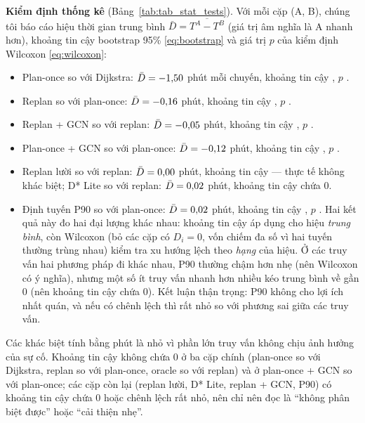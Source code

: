 \textbf{Kiểm định thống kê} (Bảng~\ref{tab:tab_stat_tests}). Với mỗi cặp (A, B), chúng tôi báo cáo hiệu thời gian trung
bình $\bar{D}=\overline{T^A-T^B}$ (giá trị âm nghĩa là A nhanh hơn), khoảng tin cậy bootstrap 95\% \eqref{eq:bootstrap} và
giá trị $p$ của kiểm định Wilcoxon \eqref{eq:wilcoxon}:
\begin{itemize}
    \item Plan-once so với Dijkstra: $\bar{D}=-1{,}50$ phút mỗi chuyến, khoảng tin cậy
    \CiPlanOnceDijkstraLength, $p$ \PPlanOnceDijkstraLength.
    \item Replan so với plan-once: $\bar{D}=-0{,}16$ phút, khoảng tin cậy \CiReplanPlanOnce, $p$ \PReplanPlanOnce.
    \item Replan + GCN so với replan: $\bar{D}=-0{,}05$ phút, khoảng tin cậy \CiReplanGnnReplan, $p$ \PReplanGnnReplan.
    \item Plan-once + GCN so với plan-once: $\bar{D}=-0{,}12$ phút, khoảng tin cậy \CiPlanOnceGnnPlanOnce,
    $p$ \PPlanOnceGnnPlanOnce.
    \item Replan lười so với replan: $\bar{D}=0{,}00$ phút, khoảng tin cậy \CiReplanLazyReplan{} --- thực tế
    không khác biệt; D* Lite so với replan: $\bar{D}=0{,}02$ phút, khoảng tin cậy \CiReplanDstarReplan{} chứa 0.
    \item Định tuyến P90 so với plan-once: $\bar{D}=0{,}02$ phút, khoảng tin cậy \CiRiskPPlanOnce, $p$
    \PRiskPPlanOnce. Hai kết quả này đo hai đại lượng khác nhau: khoảng tin cậy áp dụng cho hiệu \emph{trung bình}, còn
    Wilcoxon (bỏ các cặp có $D_i=0$, vốn chiếm đa số vì hai tuyến thường trùng nhau) kiểm tra xu hướng lệch theo \emph{hạng} của
    hiệu. Ở các truy vấn hai phương pháp đi khác nhau, P90 thường chậm hơn nhẹ (nên Wilcoxon có ý nghĩa), nhưng một số ít
    truy vấn nhanh hơn nhiều kéo trung bình về gần 0 (nên khoảng tin cậy chứa 0). Kết luận thận trọng: P90 không cho lợi ích
    nhất quán, và nếu có chênh lệch thì rất nhỏ so với phương sai giữa các truy vấn.
\end{itemize}
Các khác biệt tính bằng phút là nhỏ vì phần lớn truy vấn không chịu ảnh hưởng của sự cố. Khoảng tin cậy không chứa 0 ở
ba cặp chính (plan-once so với Dijkstra, replan so với plan-once, oracle so với replan) và ở plan-once + GCN so với
plan-once; các cặp còn lại (replan lười, D* Lite, replan + GCN, P90) có khoảng tin cậy chứa 0 hoặc chênh lệch rất nhỏ,
nên chỉ nên đọc là ``không phân biệt được'' hoặc ``cải thiện nhẹ''.


